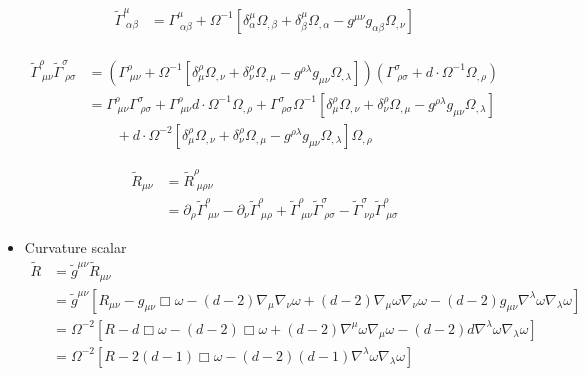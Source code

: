 \documentclass[10pt,a4paper]{article}
\theoremstyle{definition}
\begin{document}
\begin{itemize}
\begin{align}
\tilde\Gamma^\mu_{\;\alpha\beta}
&=\Gamma^\mu_{\;\alpha\beta}+\Omega^{-1}\left[
 \delta^\mu_\alpha\Omega_{,\beta}
+\delta_\beta^\mu\Omega_{,\alpha}
-g^{\mu\nu}g_{\alpha\beta}\Omega_{,\nu}
\right]\\
\end{align}

\begin{align}
\tilde\Gamma^\rho_{\;\mu\nu}\tilde\Gamma^\sigma_{\;\rho\sigma}
&=\left(\Gamma^\rho_{\;\mu\nu}+\Omega^{-1}\left[
 \delta^\rho_\mu\Omega_{,\nu}
+\delta_\nu^\rho\Omega_{,\mu}
-g^{\rho\lambda}g_{\mu\nu}\Omega_{,\lambda}
\right]\right)\left(\Gamma^\sigma_{\;\rho\sigma}+d\cdot\Omega^{-1}\Omega_{,\rho}\right)\\
&=\Gamma^\rho_{\;\mu\nu}\Gamma^\sigma_{\;\rho\sigma}
+\Gamma^\rho_{\;\mu\nu}d\cdot\Omega^{-1}\Omega_{,\rho}
+\Gamma^\sigma_{\;\rho\sigma}\Omega^{-1}\left[
 \delta^\rho_\mu\Omega_{,\nu}
+\delta_\nu^\rho\Omega_{,\mu}
-g^{\rho\lambda}g_{\mu\nu}\Omega_{,\lambda}
\right]\\
&\qquad+
d\cdot\Omega^{-2}\left[
 \delta^\rho_\mu\Omega_{,\nu}
+\delta_\nu^\rho\Omega_{,\mu}
-g^{\rho\lambda}g_{\mu\nu}\Omega_{,\lambda}
\right]\Omega_{,\rho}
\end{align}



\begin{align}
    \tilde{R}_{\mu\nu}
    &=\tilde{R}^\rho_{\;\mu\rho\nu}\\
    &=\partial_\rho\tilde\Gamma^\rho_{\;\mu\nu}
    -\partial_\nu\tilde\Gamma^\rho_{\;\mu\rho}
    +\tilde\Gamma^\rho_{\;\mu\nu}\tilde\Gamma^\sigma_{\;\rho\sigma}
    -\tilde\Gamma^\sigma_{\;\nu\rho}\tilde\Gamma^\rho_{\;\mu\sigma}
\end{align}

\item Curvature scalar
\begin{align}
    \tilde{R}
    &=\tilde{g}^{\mu\nu}\tilde{R}_{\mu\nu}\\
    &=\tilde{g}^{\mu\nu}\left[R_{\mu\nu}-g_{\mu\nu}\Box\omega-(d-2)\nabla_\mu\nabla_\nu\omega+(d-2)\nabla_\mu\omega\nabla_\nu\omega-(d-2)g_{\mu\nu}\nabla^\lambda\omega\nabla_\lambda\omega\right]\\
    &=\Omega^{-2}\left[R-d\Box\omega-(d-2)\Box\omega+(d-2)\nabla^\mu\omega\nabla_\mu\omega-(d-2)d\nabla^\lambda\omega\nabla_\lambda\omega\right]\\
    &=\Omega^{-2}\left[R-2(d-1)\Box\omega-(d-2)(d-1)\nabla^\lambda\omega\nabla_\lambda\omega\right]\\
\end{align}

\end{itemize}
\end{document}
